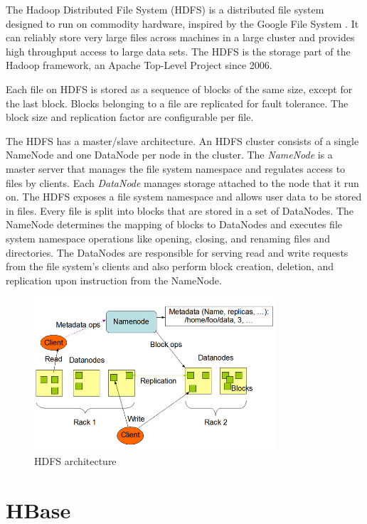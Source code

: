 The Hadoop Distributed File System (HDFS) \cite{hadoop,hdfs_design} is a distributed file system designed to run on commodity hardware, inspired by the Google File System \cite{gfs}. It can reliably store very large files across machines in a large cluster and provides high throughput access to large data sets. The HDFS is the storage part of the Hadoop framework, an Apache Top-Level Project since 2006.

Each file on HDFS is stored as a sequence of blocks of the same size, except for the last block. Blocks belonging to a file are replicated for fault tolerance. The block size and replication factor are configurable per file.

The HDFS has a master/slave architecture. An HDFS cluster consists of a single NameNode and one DataNode per node in the cluster. The \emph{NameNode} is a master server that manages the file system namespace and regulates access to files by clients. Each \emph{DataNode} manages storage attached to the node that it run on. The HDFS exposes a file system namespace and allows user data to be stored in files. Every file is split into blocks that are stored in a set of DataNodes. The NameNode determines the mapping of blocks to DataNodes and executes file system namespace operations like opening, closing, and renaming files and directories. The DataNodes are responsible for serving read and write requests from the file system’s clients and also perform block creation, deletion, and replication upon instruction from the NameNode.

\begin{figure}[h!]
\centering
\includegraphics[width=0.8\textwidth]{figures/hdfs_architecture}
\caption{HDFS architecture}
\label{figure:hdfs_architecture}
\end{figure}


\section{HBase}

